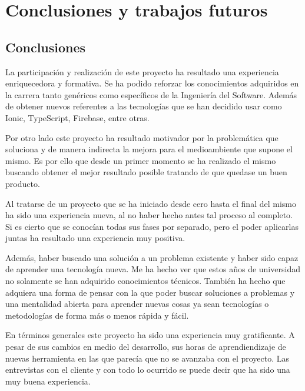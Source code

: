 \section{Conclusiones y trabajos futuros}
\subsection{Conclusiones}
La participación y realización de este proyecto ha resultado una
experiencia enriquecedora y formativa. Se ha podido reforzar los
conocimientos adquiridos en la carrera tanto genéricos como específicos
de la Ingeniería del Software. Además de obtener nuevos referentes a
las tecnologías que se han decidido usar como Ionic, TypeScript, Firebase,
entre otras.

\medskip
Por otro lado este proyecto ha resultado motivador por la problemática
que soluciona y de manera indirecta la mejora para el medioambiente
que supone el mismo. Es por ello que desde un primer momento se ha
realizado el mismo buscando obtener el mejor resultado posible tratando
de que quedase un buen producto.

\medskip
Al tratarse de un proyecto que se ha iniciado desde cero hasta el final
del mismo ha sido una experiencia nueva, al no haber hecho antes
tal proceso al completo. Si es cierto que se conocían todas sus
fases por separado, pero el poder aplicarlas juntas ha resultado
una experiencia muy positiva.

\medskip
Además, haber buscado una solución a un problema
existente y haber sido capaz de aprender una tecnología nueva.
Me ha hecho ver que estos años de universidad
no solamente se han adquirido conocimientos técnicos. También ha
hecho que adquiera una forma de pensar con la que poder buscar soluciones a
problemas y una mentalidad abierta para aprender nuevas cosas
ya sean tecnologías o metodologías de forma más o menos rápida y
fácil.

\medskip
En términos generales este proyecto ha sido una experiencia
muy gratificante. A pesar de sus cambios en medio del desarrollo,
sus horas de aprendiendizaje de nuevas herramienta en las que parecía que
no se avanzaba con el proyecto. Las entrevistas
con el cliente y con todo lo ocurrido se puede decir que ha sido
una muy buena experiencia.

